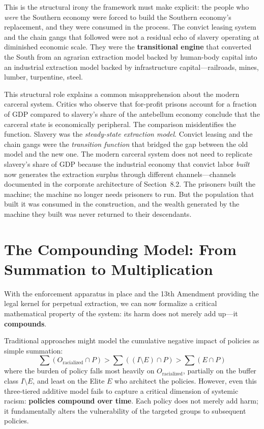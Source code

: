 \documentclass[12pt,openany]{book}
\begin{document}
This is the structural irony the framework must make explicit: the people who \textit{were} the Southern economy were forced to build the Southern economy's replacement, and they were consumed in the process. The convict leasing system and the chain gangs that followed were not a residual echo of slavery operating at diminished economic scale. They were the \textbf{transitional engine} that converted the South from an agrarian extraction model backed by human-body capital into an industrial extraction model backed by infrastructure capital---railroads, mines, lumber, turpentine, steel.

This structural role explains a common misapprehension about the modern carceral system. Critics who observe that for-profit prisons account for a fraction of GDP compared to slavery's share of the antebellum economy conclude that the carceral state is economically peripheral. The comparison misidentifies the function. Slavery was the \textit{steady-state extraction model}. Convict leasing and the chain gangs were the \textit{transition function} that bridged the gap between the old model and the new one. The modern carceral system does not need to replicate slavery's share of GDP because the industrial economy that convict labor \textit{built} now generates the extraction surplus through different channels---channels documented in the corporate architecture of Section~8.2. The prisoners built the machine; the machine no longer needs prisoners to run. But the population that built it was consumed in the construction, and the wealth generated by the machine they built was never returned to their descendants.

\section{The Compounding Model: From Summation to Multiplication}

With the enforcement apparatus in place and the 13th Amendment providing the legal kernel for perpetual extraction, we can now formalize a critical mathematical property of the system: its harm does not merely add up---it \textbf{compounds}.

Traditional approaches might model the cumulative negative impact of policies as simple summation:
\[
\sum (O_{\text{racialized}} \cap P) > \sum ((I \setminus E) \cap P) > \sum (E \cap P)
\]
where the burden of policy falls most heavily on $O_{\text{racialized}}$, partially on the buffer class $I \setminus E$, and least on the Elite $E$ who architect the policies. However, even this three-tiered additive model fails to capture a critical dimension of systemic racism: \textbf{policies compound over time}. Each policy does not merely add harm; it fundamentally alters the vulnerability of the targeted groups to subsequent policies.
\end{document}
